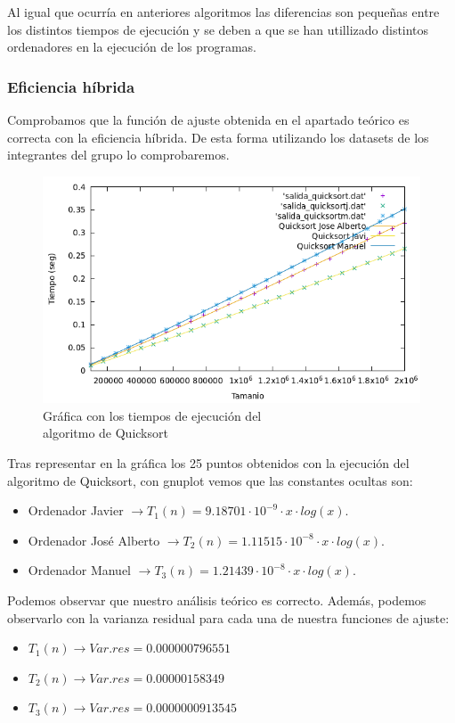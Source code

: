 \documentclass[10pt,a4paper]{article}
\begin{document}
Al igual que ocurría en anteriores algoritmos las diferencias son pequeñas entre los distintos tiempos de ejecución y se deben a que se han utillizado distintos ordenadores en la ejecución de los programas.

\subsubsection{Eficiencia híbrida}
Comprobamos que la función de ajuste obtenida en el apartado teórico es correcta con la eficiencia híbrida. De esta forma utilizando los datasets de los integrantes del grupo lo comprobaremos. 

\newpage

\begin{figure}[h!]
\centering
\includegraphics[scale=0.3]{../../Images/Quicksort_combinados.png}
\caption{Gráfica con los tiempos de ejecución del \\algoritmo de Quicksort}
\end{figure}

Tras representar en la gráfica los 25 puntos obtenidos con la ejecución del algoritmo de Quicksort, con gnuplot vemos que las constantes ocultas son:
\begin{itemize}
	\item Ordenador Javier \(\rightarrow T_1(n) = 9.18701 \cdot 10^{-9} \cdot x \cdot log(x)\).
	\item Ordenador José Alberto \(\rightarrow T_2(n) = 1.11515 \cdot 10^{-8} \cdot x \cdot log(x)\).
	\item Ordenador Manuel \(\rightarrow T_3(n) = 1.21439 \cdot 10^{-8} \cdot x \cdot log(x)\).
\end{itemize} 

Podemos observar que nuestro análisis teórico es correcto. Además, podemos observarlo con la varianza residual para cada una de nuestra funciones de ajuste:
\begin{itemize}
	\item \(T_1(n) \longrightarrow Var.res = 0.000000796551\)
	\item \(T_2(n) \longrightarrow Var.res = 0.00000158349\)
	\item \(T_3(n) \longrightarrow Var.res = 0.0000000913545\)
\end{itemize}
\end{document}
